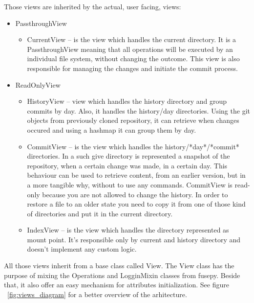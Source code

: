 Those views are inherited by the actual, user facing, views:
\begin{itemize}
    \item PassthroughView
    \begin{itemize}
        \item CurrentView – is the view which handles the current directory. It is a PassthroughView meaning that all operations will be executed by an individual file system, without changing the outcome. This view is also responsible for managing the changes and initiate the commit process.
    \end{itemize}
    
    \item ReadOnlyView
    \begin{itemize}
        \item HistoryView – view which handles the history directory and group commits by day. Also, it handles the history/{day} directories. Using the git objects from previously cloned repository, it can retrieve when changes occured and using a hashmap it can group them by day.
        \item CommitView – is the view which handles the history/*day*/*commit* directories. In a such give directory is represented a snapshot of the repository, when a certain change was made, in a certain day. This behaviour can be used to retrieve content, from an earlier version, but in a more tangible why, without to use any commands. CommitView is read-only because you are not allowed to change the history. In order to restore a file to an older state you need to copy it from one of those kind of directories and put it in the current directory.
        \item IndexView – is the view which handles the directory represented as mount point. It's responsible only by current and history directory and doesn't implement any custom logic.
    \end{itemize}
\end{itemize}

All those views inherit from a base class called View. The View class has the purpose of mixing the Operations and LogginMixin classes from fusepy. Beside that, it also offer an easy mechanism for attributes initialization. See figure ~\ref{fig:views_diagram} for a better overview of the arhitecture.

